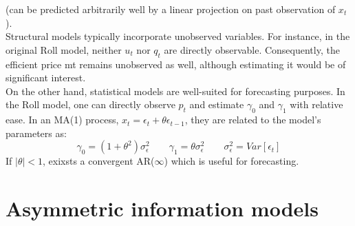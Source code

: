 (can be predicted arbitrarily well by a linear projection on past observation of $x_t$ ).\\
Structural models typically incorporate unobserved variables. For instance, in the original Roll model, neither $u_t$ nor $q_t$ are directly observable. Consequently, the efficient price mt remains unobserved as well, although estimating it would be of significant interest.\\
On the other hand, statistical models are well-suited for forecasting purposes. In the Roll model, one can directly observe $p_t$ and estimate $\gamma_0$ and $\gamma_1$ with relative ease.
In an MA(1) process, $x_t = \epsilon_t + \theta\epsilon_{t-1}$, they are related to the model's parameters as:
\[
\gamma_0 = (1 + \theta^2)\sigma_\epsilon^2 \qquad \gamma_1 = \theta\sigma_\epsilon^2 \qquad \sigma^2_{\epsilon} = Var[\epsilon_t] 
\]
If $|\theta| <1$, exixsts a convergent AR($\infty$) which is useful for forecasting.
\section{Asymmetric information models}

